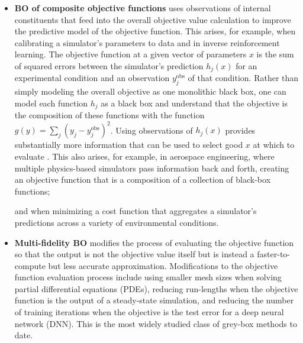\documentclass{wscpaperproc}
\newcommand{\savelength}[1]{} %
\theoremstyle{wsc}
\begin{document}
\begin{itemize}
\item \textbf{BO of composite objective functions} 
uses observations of 
internal constituents  that  feed  into  the  overall  objective value calculation to improve the predictive model of the objective function.
This arises, for example, when calibrating a simulator's parameters to data and in inverse reinforcement learning.
The objective function at a given vector of parameters $x$ is the sum of squared errors between the simulator's prediction $h_j(x)$ for an experimental condition and an observation $y_j^{\mathrm{obs}}$ of that condition. Rather than simply modeling the overall objective as one monolithic black box, one can model each function $h_j$  as a black box and understand that the objective is the composition of these functions with the function $g(y) = \sum_j (y_j-y_j^{\mathrm{obs}})^2$. Using observations of $h_j(x)$ provides substantially more information that can be used to select good $x$ at which to evaluate
.
This also arises, for example, \savelength{ inmulti-disciplinary optimization \shortcite{cramer1994problem};} in aerospace engineering, where multiple physics-based simulators pass information back and forth, creating an objective function that is a composition of a collection of black-box functions; 
\savelength{tuning hyperparameters of a machine learning method to minimize cross-validation error \shortcite{swersky2013multi} (the objective is the average of errors associated with each individual fold);}
and when minimizing a cost function that aggregates a simulator's predictions across a variety of environmental conditions.


\item \textbf{Multi-fidelity BO} modifies the process of evaluating the objective function so that the output is not the objective value itself but is instead a faster-to-compute but less accurate approximation.
Modifications to the objective function evaluation process include using smaller mesh sizes when solving partial differential equations (PDEs), reducing run-lengths when the objective function is the output of a steady-state simulation, and reducing the number of training iterations when the objective is the test error for a deep neural network (DNN).
This is the most widely studied class of grey-box methods to date.


\end{itemize}
\end{document}

